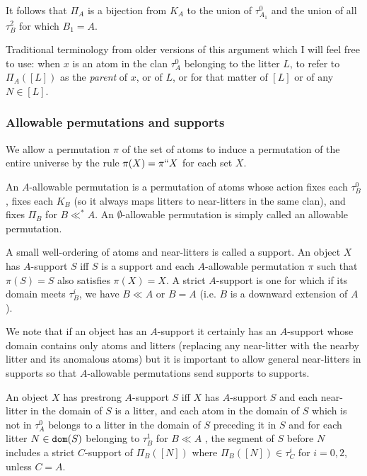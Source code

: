 \documentclass[12pt]{article}
\begin{document}
 It follows that $\Pi_A$ is a bijection from $K_A$ to the union of $\tau^0_{A_1}$ and the union of all $\tau^2_B$ for which $B_1=A$.

Traditional terminology from older versions of this argument which I will feel free to use:   when $x$ is an atom in the clan $\tau^0_A$ belonging to the litter $L$, to refer to $\Pi_A([L])$ as the {\em parent\/} of $x$, or of $L$, or for that matter of $[L]$ or of any $N \in [L]$.

\newpage

\subsubsection{Allowable permutations and supports}

We allow a permutation $\pi$ of the set of atoms to induce a permutation of the entire universe by the rule $\pi(X) =\pi``X$ for each set $X$.

An $A$-allowable permutation is a permutation of atoms whose action fixes each $\tau^0_B$, fixes each $K_B$ (so it always maps litters to near-litters in the same clan), and fixes $\Pi_B$ for $B \ll^* A$. 
An $\emptyset$-allowable permutation is simply called an allowable permutation.

A small well-ordering of atoms and near-litters is called a support.   An object $X$ has $A$-support $S$ iff $S$ is a support and each $A$-allowable permutation $\pi$ such that $\pi(S)=S$ also
satisfies $\pi(X)=X$.  A strict $A$-support is one for which if its domain meets $\tau^i_B$, we have $B \ll A$ or $B=A$ (i.e. $B$ is a downward extension of $A$).

We note that if an object has an $A$-support it certainly has an $A$-support whose domain contains only atoms and litters (replacing any near-litter with the nearby litter and its anomalous atoms)
but it is important to allow general near-litters in supports so that $A$-allowable permutations send supports to supports.

An object $X$ has prestrong $A$-support $S$ iff $X$ has $A$-support $S$ %
and each near-litter in the domain of $S$ is a litter,
 and each atom in the domain of $S$ which is not in $\tau^0_A$ belongs to a litter in the domain of $S$ preceding it in $S$ and for each litter $N \in{\tt dom}(S)$ belonging to $\tau^1_B$ for $B \ll A$
, the segment of $S$
before $N$ includes  a strict $C$-support of $\Pi_B([N])$ where  $\Pi_B([N])\in \tau^i_C$ for $i=0,2$, unless $C=A$.
\end{document}
